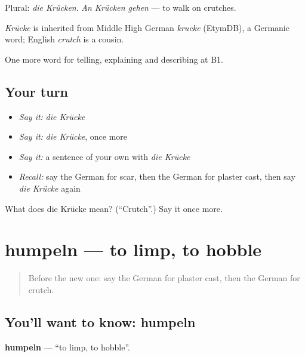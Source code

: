 Plural: \emph{die Krücken}. \emph{An Krücken gehen} — to walk on crutches.

\begin{cousinweb}
\emph{Krücke} is inherited from Middle High German \emph{krucke} (EtymDB), a Germanic word; English \emph{crutch} is a cousin.
\end{cousinweb}

\begin{grammarlens}[title={What you've built}]
One more word for telling, explaining and describing at B1.
\end{grammarlens}

\subsection*{Your turn}
\begin{itemize}
\raggedright
  \item \emph{Say it:} \emph{die Krücke}
  \item \emph{Say it:} \emph{die Krücke}, once more
  \item \emph{Say it:} a sentence of your own with \emph{die Krücke}
  \item \emph{Recall:} say the German for scar, then the German for plaster cast, then say \emph{die Krücke} again
\end{itemize}

\begin{tcolorbox}[breakable,colback=teal!4,colframe=teal!35!black,title={Before you move on}]
What does die Krücke mean? (\textquotedblleft{}Crutch\textquotedblright{}.) Say it once more.
\end{tcolorbox}
\section[humpeln]{humpeln — to limp, to hobble}

\label{lesson:GE-C483-humpeln}



\begin{quote}
Before the new one: say the German for plaster cast, then the German for crutch.
\end{quote}

\subsection*{You'll want to know: humpeln}
\textbf{humpeln} — \textquotedblleft{}to limp, to hobble\textquotedblright{}.


